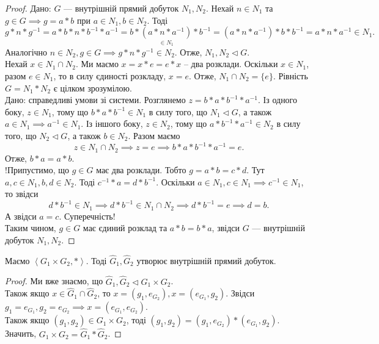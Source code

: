 \documentclass{math_library}
\begin{document}
\begin{proof}
\rightproof Дано: $G$ --- внутрішній прямий добуток $N_1,N_2$. Нехай $n \in N_1$ та $g \in G \implies g = a*b$ при $a \in N_1,b \in N_2$. Тоді \[
g*n*g^{-1} = a*b*n*b^{-1}*a^{-1} = b*\underset{\in N_1}{(a*n*a^{-1})}*b^{-1} = (a*n*a^{-1})*b*b^{-1} = a*n*a^{-1} \in N_1.
\]
Аналогічно $n \in N_2, g \in G \implies g*n*g^{-1} \in N_2$. Отже, $N_1,N_2 \triangleleft G$.\\
Нехай $x \in N_1 \cap N_2$. Ми маємо $x = x*e = e*x$ -- два розклади. Оскільки $x \in N_1$, разом $e \in N_1$, то в силу єдиності розкладу, $x = e$. Отже, $N_1 \cap N_2 = \{e\}$. Рівність $G = N_1*N_2$ є цілком зрозумілою.
\bigskip \\
\leftproof Дано: справедливі умови зі системи. Розглянемо $z = b*a*b^{-1}*a^{-1}$. Із одного боку, $z \in N_1$, тому що $b*a*b^{-1} \in N_1$ в силу того, що $N_1 \triangleleft G$, а також $a \in N_1 \implies a^{-1} \in N_1$. Із іншого боку, $z \in N_2$, тому що $a*b^{-1}*a^{-1} \in N_2$ в силу того, що $N_2 \triangleleft G$, а також $b \in N_2$. Разом маємо 
\[
z \in N_1 \cap N_2 \implies z = e \implies b*a*b^{-1}*a^{-1} = e.
\]
Отже, $b*a = a*b$.\\
!Припустимо, що $g \in G$ має два розклади. Тобто $g = a*b = c*d$. Тут $a,c \in N_1, b,d \in N_2$. Тоді $c^{-1}*a=d*b^{-1}$. Оскільки $a \in N_1, c \in N_1 \implies c^{-1} \in N_1$, то звідси 
\[
d*b^{-1} \in N_1 \implies d*b^{-1} \in N_1 \cap N_2 \implies d*b^{-1} = e \implies d = b.
\]
А звідси $a = c$. Суперечність!\\
Таким чином, $g \in G$ має єдиний розклад та $a*b=b*a$, звідси $G$ --- внутрішній добуток $N_1,N_2$.
\end{proof}

\begin{corollary}
Маємо $\left< G_1 \times G_2, * \right>$. Тоді $\hat{G}_1, \hat{G}_2$ утворює внутрішній прямий добуток.
\end{corollary}

\begin{proof}
Ми вже знаємо, що $\hat{G}_1, \hat{G}_2 \triangleleft G_1 \times G_2$.\\
Також якщо $x \in \hat{G}_1 \cap \hat{G}_2$, то $x = (g_1,e_{G_2}), x = (e_{G_1},g_2)$. Звідси $g_1 = e_{G_1}, g_2 = e_{G_2} \implies x = (e_{G_1},e_{G_2})$.\\
Також якщо $(g_1,g_2) \in G_1 \times G_2$, тоді $(g_1,g_2) = (g_1,e_{G_2})*(e_{G_1},g_2)$. Значить, $G_1 \times G_2 = \hat{G}_1 * \hat{G}_2$.
\end{proof}
\end{document}
